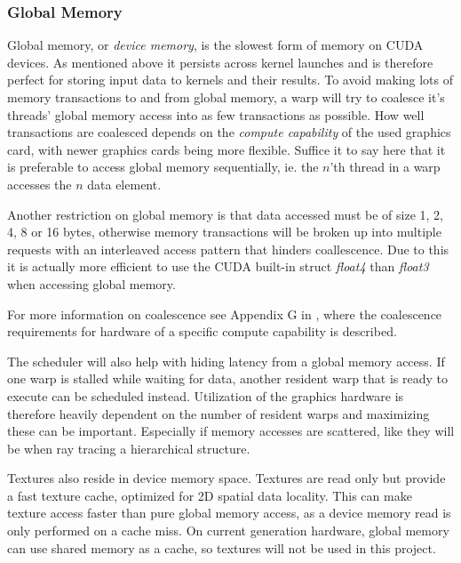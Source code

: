 \subsubsection{Global Memory}


Global memory, or \textit{device memory}, is the slowest form of
memory on CUDA devices. As mentioned above it persists across kernel
launches and is therefore perfect for storing input data to kernels
and their results. To avoid making lots of memory transactions to and
from global memory, a warp will try to coalesce it's threads' global
memory access into as few transactions as possible. How well
transactions are coalesced depends on the \textit{compute capability}
of the used graphics card, with newer graphics cards being more
flexible. Suffice it to say here that it is preferable to access
global memory sequentially, ie. the $n$'th thread in a warp accesses
the $n$ data element.


Another restriction on global memory is that data accessed must be of
size 1, 2, 4, 8 or 16 bytes, otherwise memory transactions will be
broken up into multiple requests with an interleaved access pattern
that hinders coallescence. Due to this it is actually more efficient
to use the CUDA built-in struct \textit{float4} than \textit{float3}
when accessing global memory.

For more information on coalescence see Appendix G in
, where the coalescence requirements for hardware of
a specific compute capability is described.


The scheduler will also help with hiding latency from a global memory
access. If one warp is stalled while waiting for data, another
resident warp that is ready to execute can be scheduled
instead. Utilization of the graphics hardware is therefore heavily
dependent on the number of resident warps and maximizing these can be
important. Especially if memory accesses are scattered, like they will
be when ray tracing a hierarchical structure.


Textures also reside in device memory space. Textures are read only
but provide a fast texture cache, optimized for 2D spatial data
locality. This can make texture access faster than pure global memory
access, as a device memory read is only performed on a cache miss. On
current generation hardware, global memory can use shared memory as a
cache, so textures will not be used in this project.

